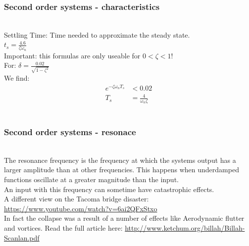 \begin{frame}
\frametitle{Second order systems - characteristics}
\\ Settling Time: Time needed to approximate the steady state.
\\ $t_s = \frac{4.6}{\zeta\omega_n}$
\pause
\\ Important: this formulas are only useable for $0<\zeta<1$!
\vspace{0.15cm}
\pause
\\ For: $\delta = \frac{0.02}{\sqrt{1-\zeta^2}}$
\vspace{0.15cm}
\pause
\\ We find:
\vspace{-0.6cm}
\begin{align*}
 e^{-\zeta\omega_n T_s} &< 0.02
\\ T_s &= \frac{4}{\omega_n\zeta}
\end{align*}
\\ \begin{figure}
\end{figure}
\end{frame}

\begin{frame}
\frametitle{Second order systems - resonace}
\\ The resonance frequency is the frequency at which the systems output has a larger amplitude than at other frequencies. This happens when underdamped functions oscillate at a greater magnitude than the input.
\vspace{0.35cm}
\pause
\\ An input with this frequency can sometime have catastrophic effects.
\vspace{0.35cm}
\pause
\\ A different view on the Tacoma bridge disaster: \url{https://www.youtube.com/watch?v=6ai2QFxStxo}
\vspace{0.35cm}
\\ In fact the collapse was a result of a number of effects like Aerodynamic flutter and vortices. Read the full article here: \url{http://www.ketchum.org/billah/Billah-Scanlan.pdf}
\end{frame}

